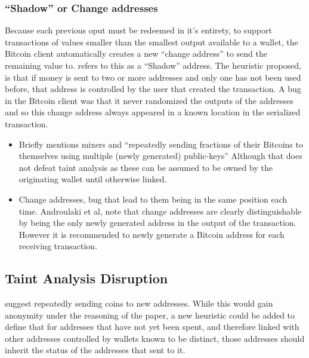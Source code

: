 \subsubsection{``Shadow'' or Change addresses}
Because each previous oput must be redeemed in it's entirety, to support transactions of values smaller than the smallest output available to a wallet, the Bitcoin client automatically creates a new ``change address'' to send the remaining value to.  \cite{eval-priv} refers to this as a ``Shadow'' address.  The heuristic proposed, is that if money is sent to two or more addresses and only one has not been used before, that address is controlled by the user that created the transaction. A bug in the Bitcoin client was that it never randomized the outputs of the addresses and so this change address always appeared in a known location in the serialized transaction\cite{cve-ordered-trans}.

\begin{itemize} \item Briefly mentions mixers and ``repeatedly sending fractions
        of their Bitcoins to themselves using multiple (newly generated)
    public-keys'' Although that does not defeat taint analysis as these can be
assumed to be owned by the originating wallet until otherwise linked.  \item
    Change addresses, bug that lead to them being in the same position each
    time.  Androulaki et al, note that change addresses are clearly
    distinguishable by being the only newly generated address in the output of
    the transaction.  However it is recommended to newly generate a Bitcoin
    address for each receiving transaction.  \end{itemize}

\subsection{Taint Analysis Disruption}
\textcite{reid-anon} suggest repeatedly sending coins to new addresses. While this would gain anonymity under the reasoning of the paper, a new heuristic could be added to define that for addresses that have not yet been spent, and therefore linked with other addresses controlled by wallets known to be distinct, those addresses should inherit the status of the addresses that sent to it.

